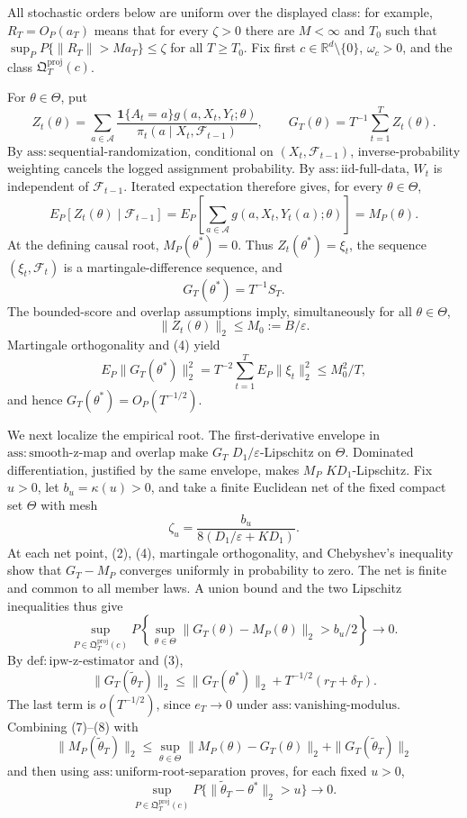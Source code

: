 All stochastic orders below are uniform over the displayed class: for example, \(R_T=O_P(a_T)\) means that for every \(\zeta>0\) there are \(M<\infty\) and \(T_0\) such that \(\sup_P P\{\|R_T\|>Ma_T\}\le\zeta\) for all \(T\ge T_0\). Fix first \(c\in\mathbb R^d\setminus\{0\}\), \(\omega_c>0\), and the class \(\mathfrak Q_T^{\mathrm{proj}}(c)\).

For \(\theta\in\Theta\), put
\[
 Z_t(\theta)=\sum_{a\in\mathcal A}
 \frac{\mathbf 1\{A_t=a\}g(a,X_t,Y_t;\theta)}
 {\pi_t(a\mid X_t,\mathcal F_{t-1})},
 \qquad G_T(\theta)=T^{-1}\sum_{t=1}^T Z_t(\theta).
 \tag{1}
\]
By \(\mathrm{ass:sequential\text{-}randomization}\), conditional on \((X_t,\mathcal F_{t-1})\), inverse-probability weighting cancels the logged assignment probability. By \(\mathrm{ass:iid\text{-}full\text{-}data}\), \(W_t\) is independent of \(\mathcal F_{t-1}\). Iterated expectation therefore gives, for every \(\theta\in\Theta\),
\[
 E_P[Z_t(\theta)\mid\mathcal F_{t-1}]
 =E_P\!\left[\sum_{a\in\mathcal A}g(a,X_t,Y_t(a);\theta)\right]
 =M_P(\theta).
 \tag{2}
\]
At the defining causal root, \(M_P(\theta^*)=0\). Thus \(Z_t(\theta^*)=\xi_t\), the sequence \((\xi_t,\mathcal F_t)\) is a martingale-difference sequence, and
\[
 G_T(\theta^*)=T^{-1}S_T.
 \tag{3}
\]
The bounded-score and overlap assumptions imply, simultaneously for all \(\theta\in\Theta\),
\[
 \|Z_t(\theta)\|_2\le M_0:=B/\varepsilon.
 \tag{4}
\]
Martingale orthogonality and (4) yield
\[
 E_P\|G_T(\theta^*)\|_2^2
 =T^{-2}\sum_{t=1}^T E_P\|\xi_t\|_2^2
 \le M_0^2/T,
 \tag{5}
\]
and hence \(G_T(\theta^*)=O_P(T^{-1/2})\).

We next localize the empirical root. The first-derivative envelope in \(\mathrm{ass:smooth\text{-}z\text{-}map}\) and overlap make \(G_T\) \(D_1/\varepsilon\)-Lipschitz on \(\Theta\). Dominated differentiation, justified by the same envelope, makes \(M_P\) \(KD_1\)-Lipschitz. Fix \(u>0\), let \(b_u=\kappa(u)>0\), and take a finite Euclidean net of the fixed compact set \(\Theta\) with mesh
\[
 \zeta_u=\frac{b_u}{8(D_1/\varepsilon+KD_1)}.
 \tag{6}
\]
At each net point, (2), (4), martingale orthogonality, and Chebyshev's inequality show that \(G_T-M_P\) converges uniformly in probability to zero. The net is finite and common to all member laws. A union bound and the two Lipschitz inequalities thus give
\[
 \sup_{P\in\mathfrak Q_T^{\mathrm{proj}}(c)}
 P\!\left\{\sup_{\theta\in\Theta}
 \|G_T(\theta)-M_P(\theta)\|_2>b_u/2\right\}\longrightarrow0.
 \tag{7}
\]
By \(\mathrm{def:ipw\text{-}z\text{-}estimator}\) and (3),
\[
 \|G_T(\widetilde\theta_T)\|_2
 \le \|G_T(\theta^*)\|_2+T^{-1/2}(r_T+\delta_T).
 \tag{8}
\]
The last term is \(o(T^{-1/2})\), since \(e_T\to0\) under \(\mathrm{ass:vanishing\text{-}modulus}\). Combining (7)--(8) with
\[
 \|M_P(\widetilde\theta_T)\|_2
 \le \sup_{\theta\in\Theta}\|M_P(\theta)-G_T(\theta)\|_2
 +\|G_T(\widetilde\theta_T)\|_2
 \tag{9}
\]
and then using \(\mathrm{ass:uniform\text{-}root\text{-}separation}\) proves, for each fixed \(u>0\),
\[
 \sup_{P\in\mathfrak Q_T^{\mathrm{proj}}(c)}
 P\{\|\widetilde\theta_T-\theta^*\|_2>u\}\longrightarrow0.
 \tag{10}
\]

